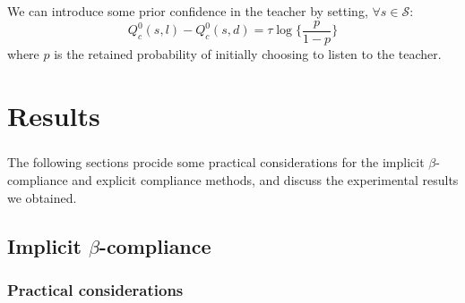 \documentclass[a4paper]{report}
\begin{document}
{{{{			\paragraph{} We can introduce some prior confidence in the teacher by setting, $\forall s\in\mathcal{S}$: 
			\begin{equation}
				Q^0_c(s,l) - Q^0_c(s,d) =\tau \log\{\frac{p}{1-p}\}
			\end{equation}
			where $p$ is the retained probability of initially choosing to listen to the teacher. 
			}
		}	
	}
	
	\chapter{Results}
	{
		\label{chap::res}
				\paragraph{} The following sections procide some practical considerations for the implicit $\beta$-compliance and explicit compliance methods, and discuss the experimental results we obtained. 
		\section{Implicit $\beta$-compliance}
		{
			\subsection{Practical considerations}
			{
}}}}
\end{document}
